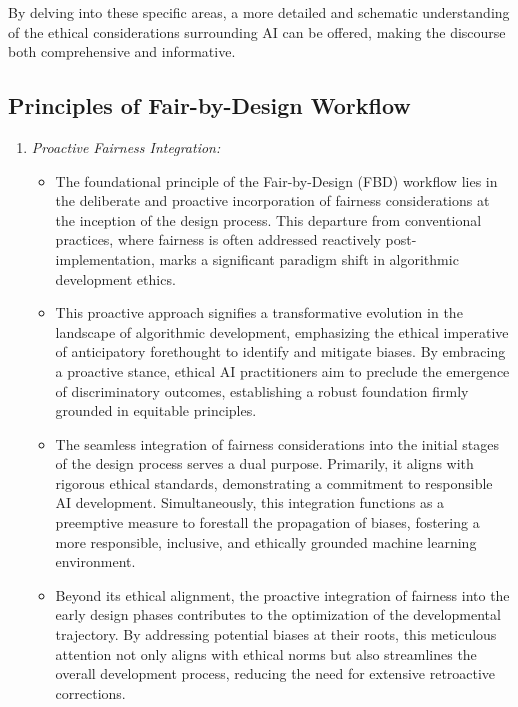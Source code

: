 By delving into these specific areas, a more detailed and schematic understanding of the ethical considerations surrounding AI can be offered, making the discourse both comprehensive and informative.

\subsection{Principles of Fair-by-Design Workflow}
\label{subsection:workflow-principles}

\begin{enumerate}[label=\arabic*.]
    \item \emph{Proactive Fairness Integration:}
    
    \begin{itemize}
       
        \item The foundational principle of the Fair-by-Design (FBD) workflow lies in the deliberate and proactive incorporation of fairness considerations at the inception of the design process. This departure from conventional practices, where fairness is often addressed reactively post-implementation, marks a significant paradigm shift in algorithmic development ethics.
    
        \item This proactive approach signifies a transformative evolution in the landscape of algorithmic development, emphasizing the ethical imperative of anticipatory forethought to identify and mitigate biases. By embracing a proactive stance, ethical AI practitioners aim to preclude the emergence of discriminatory outcomes, establishing a robust foundation firmly grounded in equitable principles.
    
        \item The seamless integration of fairness considerations into the initial stages of the design process serves a dual purpose. Primarily, it aligns with rigorous ethical standards, demonstrating a commitment to responsible AI development. Simultaneously, this integration functions as a preemptive measure to forestall the propagation of biases, fostering a more responsible, inclusive, and ethically grounded machine learning environment.
    
        \item Beyond its ethical alignment, the proactive integration of fairness into the early design phases contributes to the optimization of the developmental trajectory. By addressing potential biases at their roots, this meticulous attention not only aligns with ethical norms but also streamlines the overall development process, reducing the need for extensive retroactive corrections.
    

\end{itemize}
\end{enumerate}
